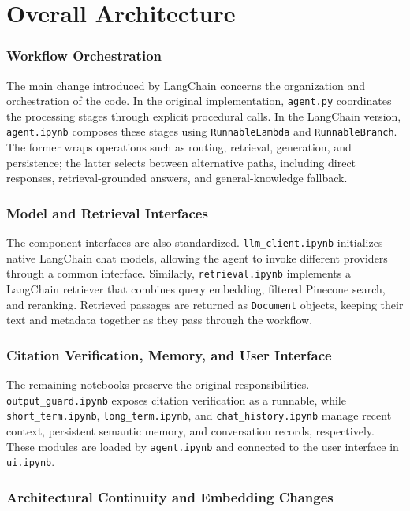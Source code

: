 \documentclass[a4paper,12pt]{report}
\begin{document}
\section{Overall Architecture}

\subsubsection{Workflow Orchestration}

The main change introduced by LangChain concerns the organization
and orchestration of the code. In the original implementation,
\texttt{agent.py} coordinates the processing stages through
explicit procedural calls. In the LangChain version,
\texttt{agent.ipynb} composes these stages using
\texttt{RunnableLambda} and \texttt{RunnableBranch}. The former
wraps operations such as routing, retrieval, generation, and
persistence; the latter selects between alternative paths,
including direct responses, retrieval-grounded answers, and
general-knowledge fallback.

\subsubsection{Model and Retrieval Interfaces}

The component interfaces are also standardized.
\texttt{llm\_client.ipynb} initializes native LangChain chat models,
allowing the agent to invoke different providers through a common
interface. Similarly, \texttt{retrieval.ipynb} implements a
LangChain retriever that combines query embedding, filtered
Pinecone search, and reranking. Retrieved passages are returned
as \texttt{Document} objects, keeping their text and metadata
together as they pass through the workflow.

\subsubsection{Citation Verification, Memory, and User Interface}

The remaining notebooks preserve the original responsibilities.
\texttt{output\_guard.ipynb} exposes citation verification as a
runnable, while \texttt{short\_term.ipynb},
\texttt{long\_term.ipynb}, and \texttt{chat\_history.ipynb}
manage recent context, persistent semantic memory, and conversation
records, respectively. These modules are loaded by
\texttt{agent.ipynb} and connected to the user interface in
\texttt{ui.ipynb}.

\subsubsection{Architectural Continuity and Embedding Changes}
\end{document}
